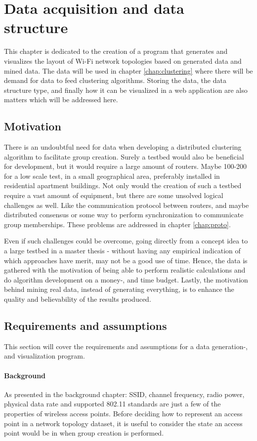 \chapter{Data acquisition and data structure}\label{dataacc}
This chapter is dedicated to the creation of a program that generates and visualizes the layout of Wi-Fi network topologies based on generated data and mined data.
The data will be used in chapter \ref{chap:clustering} where there will be demand for data to feed clustering algorithms. Storing the data,
the data structure type, and finally how it can be visualized in a web application are also matters which will be addressed here. 

\section{Motivation}
There is an undoubtful need for data when developing a distributed clustering algorithm to facilitate group creation.
Surely a testbed would also be beneficial for development, but it would require a large amount of routers. Maybe 100-200 for a low scale test, in a small geographical area,
preferably installed in residential apartment buildings. Not only would the creation of such a testbed require a vast amount of equipment, but there are 
some unsolved logical challenges as well. Like the communication protocol between routers, and maybe distributed consensus or some way to perform synchronization to communicate group memberships.
These problems are addressed in chapter \ref{chap:proto}.

Even if such challenges could be overcome, going directly from a concept idea to a large testbed in a master thesis  - without having any empirical indication of which approaches have merit, may not be a good use of time. Hence, the data is gathered with the motivation of being able to perform realistic calculations and do algorithm development on a money-, and time budget. Lastly, the motivation behind mining real data, instead of generating everything, is to enhance the quality and believability of the results produced. 

\section{Requirements and assumptions}
This section will cover the requirements and assumptions for a data generation-, and visualization program. 

\subsubsection{Background}
As presented in the background chapter: SSID, channel frequency, radio power, physical data rate and supported 802.11 standards are just a few of the properties
of wireless access points. Before deciding how to represent an access point in a network topology dataset, it is useful to
consider the state an access point would be in when group creation is performed.  

